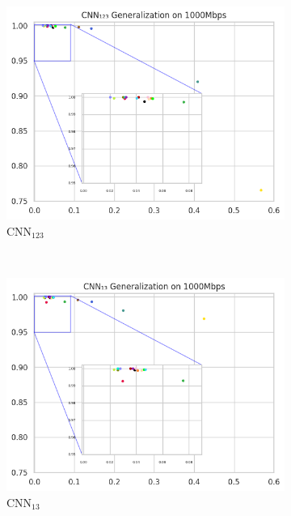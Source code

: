 \documentclass[a4paper,fleqn]{cas-sc}
\begin{document}
\begin{figure}[h!]
\begin{minipage}[t]{0.46\textwidth}
		\begin{subfigure}[t]{0.33\textwidth}
			\includegraphics[draft=false, width=\textwidth]{./figs/Generalizacao-CNN123-1000Mbps.png} 
			\caption{CNN$_{123}$}
			\label{fig:Generalizacao-CNN123-1000Mbps}
		\end{subfigure}%
		~
		\begin{subfigure}[t]{0.33\textwidth}
			\includegraphics[draft=false, width=\textwidth]{./figs/Generalizacao-CNN13-1000Mbps.png} 
			\caption{CNN$_{13}$}
			\label{fig:2a}
		\end{subfigure}%
		~
		\begin{subfigure}[t]{0.33\textwidth}

\end{subfigure}
\end{minipage}
\end{figure}
\end{document}
